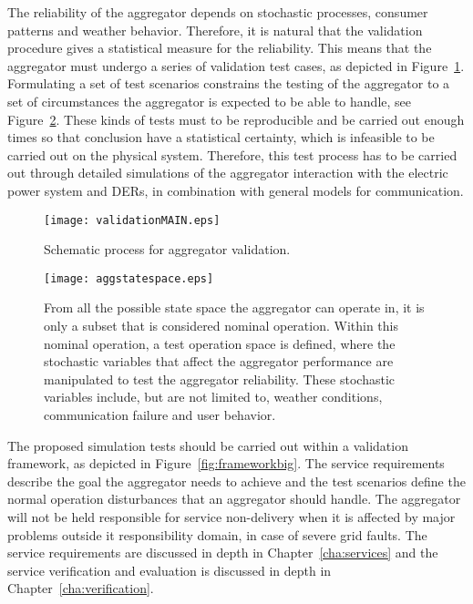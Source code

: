 The reliability of the aggregator depends on stochastic processes, \eg consumer patterns and weather behavior. Therefore, it is natural that the validation procedure gives a statistical measure for the reliability. This means that the aggregator must undergo a series of validation test cases, as depicted in Figure~\ref{fig:MAINframework}. Formulating a set of test scenarios constrains the testing of the aggregator to a set of circumstances the aggregator is expected to be able to handle, see Figure~\ref{fig:aggstatespace}. These kinds of tests must to be reproducible and be carried out enough times so that conclusion have a statistical certainty, which is infeasible to be carried out on the physical system. Therefore, this test process has to be carried out through detailed simulations of the aggregator interaction with the electric power system and DERs, in combination with general models for communication.
\begin{figure}[htbp!]
\centering
\texttt{[image: validationMAIN.eps]}
\caption{Schematic process for aggregator validation.}
\label{fig:MAINframework}
\end{figure}

\begin{figure}[htpb!]
\centering
\texttt{[image: aggstatespace.eps]}
\caption{From all the possible state space the aggregator can operate in, it is only a subset that is considered nominal operation. Within this nominal operation, a test operation space is defined, where the stochastic variables that affect the aggregator performance are manipulated to test the aggregator reliability. These stochastic variables include, but are not limited to, weather conditions, communication failure and user behavior.}
\label{fig:aggstatespace}
\end{figure}

The proposed simulation tests should be carried out within a validation framework, as depicted in Figure~\ref{fig:frameworkbig}. The service requirements describe the goal the aggregator needs to achieve and the test scenarios define the normal operation disturbances that an aggregator should handle. The aggregator will not be held responsible for service non-delivery when it is affected by major problems outside it responsibility domain, \eg in case of severe grid faults. The service requirements are discussed in depth in Chapter~\ref{cha:services} and the service verification and evaluation is discussed in depth in Chapter~\ref{cha:verification}.

